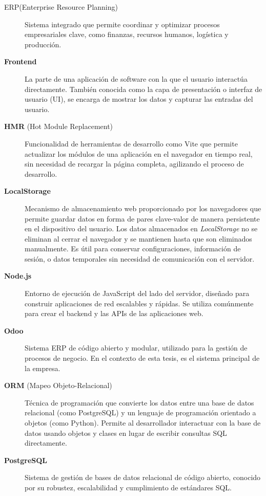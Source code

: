 \documentclass[12pt,letterpaper,spanish]{report}
\begin{document}
\begin{description}
      
  \item[ERP(Enterprise Resource Planning)]  Sistema integrado que permite coordinar y 
        optimizar procesos empresariales clave, como finanzas, recursos humanos, logística y producción. 
    
  \item[\textbf{Frontend}] La parte de una aplicación de software con la que el usuario interactúa directamente. También conocida como la capa de presentación o interfaz de usuario (UI), se encarga de mostrar los datos y capturar las entradas del usuario.
  
  \item[\textbf{HMR} (Hot Module Replacement)] Funcionalidad de herramientas de desarrollo como Vite que permite actualizar los módulos de una aplicación en el navegador en tiempo real, sin necesidad de recargar la página completa, agilizando el proceso de desarrollo.

  \item[\textbf{LocalStorage}] Mecanismo de almacenamiento web proporcionado por los navegadores que permite guardar datos en forma de pares clave-valor de manera persistente en el dispositivo del usuario. Los datos almacenados en \textit{LocalStorage} no se eliminan al cerrar el navegador y se mantienen hasta que son eliminados manualmente. Es útil para conservar configuraciones, información de sesión, o datos temporales sin necesidad de comunicación con el servidor.
    
  \item[\textbf{Node.js}] Entorno de ejecución de JavaScript del lado del servidor, diseñado para construir aplicaciones de red escalables y rápidas. Se utiliza comúnmente para crear el backend y las APIs de las aplicaciones web.

  \item[\textbf{Odoo}] Sistema ERP de código abierto y modular, utilizado para la gestión de procesos de negocio. En el contexto de esta tesis, es el sistema principal de la empresa.
  
  \item[\textbf{ORM} (Mapeo Objeto-Relacional)] Técnica de programación que convierte los datos entre una base de datos relacional (como PostgreSQL) y un lenguaje de programación orientado a objetos (como Python). Permite al desarrollador interactuar con la base de datos usando objetos y clases en lugar de escribir consultas SQL directamente.

      

  \item[\textbf{PostgreSQL}] Sistema de gestión de bases de datos relacional de código abierto, conocido por su robustez, escalabilidad y cumplimiento de estándares SQL.


\end{description}
\end{document}
